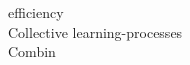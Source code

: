 \documentclass[a4paper]{article}
\begin{document}
\begin{multicols*}{2}
\begin{footnotesize}
efficiency \\ Collective learning-processes \\ Combin
\end{footnotesize}
\end{multicols*}
\end{document}
